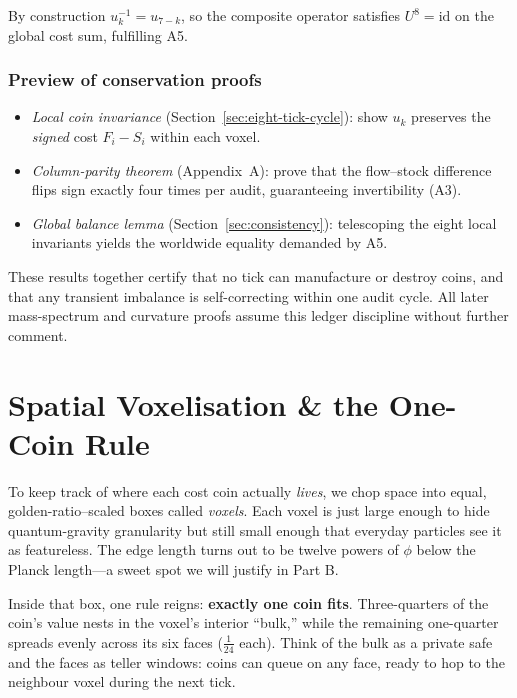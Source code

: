 \documentclass[11pt,oneside]{book}
\begin{document}
By construction \(u_{k}^{-1}=u_{7-k}\), so the composite operator satisfies
\(U^{8}=\mathrm{id}\) on the global cost sum, fulfilling A5.

\subsubsection{Preview of conservation proofs}
\label{subsubsec:conservation-preview}
\begin{itemize}
  \item \emph{Local coin invariance}  
        (Section~\ref{sec:eight-tick-cycle}):  
        show \(u_{k}\) preserves the \emph{signed} cost
        \(F_{i}-S_{i}\) within each voxel.
  \item \emph{Column-parity theorem}  
        (Appendix~A): prove that the flow–stock difference flips sign exactly
        four times per audit, guaranteeing invertibility (A3).
  \item \emph{Global balance lemma}  
        (Section~\ref{sec:consistency}):  
        telescoping the eight local invariants yields the
        worldwide equality demanded by A5.
\end{itemize}

These results together certify that no tick can manufacture or destroy coins,
and that any transient imbalance is self-correcting within one audit cycle.
All later mass-spectrum and curvature proofs assume this ledger discipline
without further comment.


\section{Spatial Voxelisation \& the One-Coin Rule}
\label{sec:voxels}

To keep track of where each cost coin actually \emph{lives}, we chop space
into equal, golden-ratio–scaled boxes called \emph{voxels}.  
Each voxel is just large enough to hide quantum-gravity granularity but still
small enough that everyday particles see it as featureless.  
The edge length turns out to be twelve powers of \(\phi\) below the Planck
length—a sweet spot we will justify in Part B.

Inside that box, one rule reigns: \textbf{exactly one coin fits}.  
Three-quarters of the coin’s value nests in the voxel’s interior “bulk,” while
the remaining one-quarter spreads evenly across its six faces
(\(\tfrac{1}{24}\) each).  
Think of the bulk as a private safe and the faces as teller windows:  
coins can queue on any face, ready to hop to the neighbour voxel during the
next tick.
\end{document}
